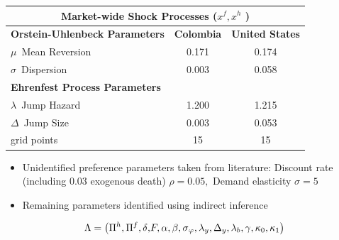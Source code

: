 \documentclass[notes=show]{beamer}
\begin{document}
\begin{frame}%

\begin{flushleft}

\end{flushleft}

\begin{center}
\begin{tabular}{lcc}
\hline\hline
\multicolumn{3}{c}{\textbf{Market-wide Shock Processes (}$x^{f},x^{h}$%
\textbf{)}} \\ \hline
\textbf{Orstein-Uhlenbeck Parameters} & \textbf{Colombia} & \textbf{United
States} \\ \hline
$\mu ${\small \ Mean Reversion} & {\small 0.171} & {\small 0.174} \\ 
$\sigma ${\small \ Dispersion} & {\small 0.003} & {\small 0.058} \\ \hline
\textbf{Ehrenfest Process Parameters} &  &  \\ \hline
$\lambda ${\small \ Jump Hazard} & {\small 1.200} & {\small 1.215} \\ 
$\Delta ${\small \ Jump Size} & {\small 0.003} & {\small 0.053} \\ 
{\small grid points} & {\small 15} & {\small 15} \\ \hline
\end{tabular}
\end{center}

\end{frame}%
\begin{frame}%



\begin{itemize}
\item Unidentified preference parameters taken from literature: Discount rate (including 0.03 exogenous death) $\rho =0.05,$ Demand elasticity $\sigma =5$

\item Remaining parameters identified using indirect inference
\end{itemize}

\[
\Lambda =\left( {\small \Pi }^{h},{\small \Pi }^{f},{\small \delta ,}F,%
{\small \alpha },{\small \beta },\sigma _{\varphi },\lambda _{y},\Delta_{y},{\small %
\lambda }_{b},{\small \gamma ,\kappa _{0},\kappa _{1}}\right) 
\]

\end{frame}%
\end{document}
